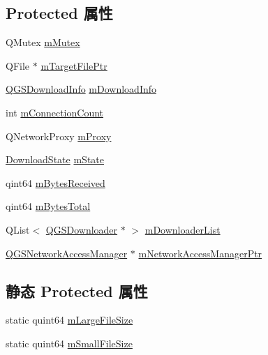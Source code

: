 \subsection*{Protected 属性}
\begin{DoxyCompactItemize}
\item 
Q\+Mutex \mbox{\hyperlink{class_q_g_s_download_task_a7a1b472aeeeb86e771fb62e187aa0592}{m\+Mutex}}
\item 
Q\+File $\ast$ \mbox{\hyperlink{class_q_g_s_download_task_a613b5ea9be7e9b4c3fc5ec7c046f012b}{m\+Target\+File\+Ptr}}
\item 
\mbox{\hyperlink{class_q_g_s_download_info}{Q\+G\+S\+Download\+Info}} \mbox{\hyperlink{class_q_g_s_download_task_a49fa2ad893768d25965ee5cd7e302462}{m\+Download\+Info}}
\item 
int \mbox{\hyperlink{class_q_g_s_download_task_a809596bbcca69aeb024ad4bbb2567d01}{m\+Connection\+Count}}
\item 
Q\+Network\+Proxy \mbox{\hyperlink{class_q_g_s_download_task_a71e39e68e92c6d69abf8dc97fb24eb80}{m\+Proxy}}
\item 
\mbox{\hyperlink{_q_g_s_download_task_8h_a94e6cd327cf2fc9490b4c797c7023a6e}{Download\+State}} \mbox{\hyperlink{class_q_g_s_download_task_a4293852bbffc628a61ea8cbc04998240}{m\+State}}
\item 
qint64 \mbox{\hyperlink{class_q_g_s_download_task_a20689acd0aed0deff72eebdecfd459c6}{m\+Bytes\+Received}}
\item 
qint64 \mbox{\hyperlink{class_q_g_s_download_task_a93415586acb3dffbe2663ff678d712bb}{m\+Bytes\+Total}}
\item 
Q\+List$<$ \mbox{\hyperlink{class_q_g_s_downloader}{Q\+G\+S\+Downloader}} $\ast$ $>$ \mbox{\hyperlink{class_q_g_s_download_task_aca235d7c927f06c6c5cd791bf2350807}{m\+Downloader\+List}}
\item 
\mbox{\hyperlink{class_q_g_s_network_access_manager}{Q\+G\+S\+Network\+Access\+Manager}} $\ast$ \mbox{\hyperlink{class_q_g_s_download_task_a33952091db0fa38a0944f7b8079186db}{m\+Network\+Access\+Manager\+Ptr}}
\end{DoxyCompactItemize}
\subsection*{静态 Protected 属性}
\begin{DoxyCompactItemize}
\item 
static quint64 \mbox{\hyperlink{class_q_g_s_download_task_ab80e3d2c955ce27e7cb0e4a74b599823}{m\+Large\+File\+Size}}
\item 
static quint64 \mbox{\hyperlink{class_q_g_s_download_task_aa3a4bb937386807e10a1a63950facb1b}{m\+Small\+File\+Size}}
\end{DoxyCompactItemize}
